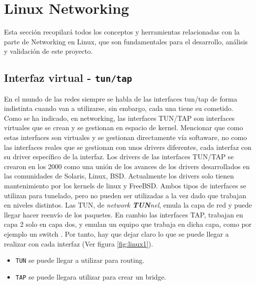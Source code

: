 \section{Linux Networking}
\label{sec:linuxNetworking}

Esta sección recopilará todos los conceptos y herramientas relacionadas con la parte de Networking en Linux, que son fundamentales para el desarrollo, análisis y validación de este proyecto.



\subsection{Interfaz virtual - \texttt{tun/tap}}
\label{linuxNetworking_tuntap}

En el mundo de las redes siempre se habla de las interfaces tun/tap de forma indistinta cuando van a utilizarse, sin embargo, cada una tiene su cometido. Como se ha indicado, en networking, las interfaces TUN/TAP son interfaces virtuales que se crean y se gestionan en espacio de kernel. Mencionar que como estas interfaces son virtuales y se gestionan directamente vía softaware, no como las interfaces reales que se gestionan con unos drivers diferentes, cada interfaz con su driver específico de la interfaz.  Los drivers de las interfaces TUN/TAP se crearon en los 2000 como una unión de los avances de los drivers desarrollados en las comunidades de Solaris, Linux, BSD. Actualmente los drivers solo tienen mantenimiento por los kernels de linux y FreeBSD. Ambos tipos de interfaces se utilizan para tunelado, pero no pueden ser utilizadas a la vez dado que trabajan en niveles distintos. Las TUN, de \textit{network \textbf{TUN}nel}, emula la capa de red y puede llegar hacer reenvío de los paquetes. En cambio las interfaces TAP,  trabajan en capa 2 solo en capa dos, y emulan un equipo que trabaja en dicha capa, como por ejemplo un switch \cite{tuntap1}. Por tanto, hay que dejar claro lo que se puede llegar a realizar con cada interfaz (Ver figura \ref{fig:linux1}).

\begin{itemize}
    \item \texttt{TUN} se puede llegar a utilizar para routing.
    \item \texttt{TAP} se puede llegara utilizar para crear un bridge.
\end{itemize}

